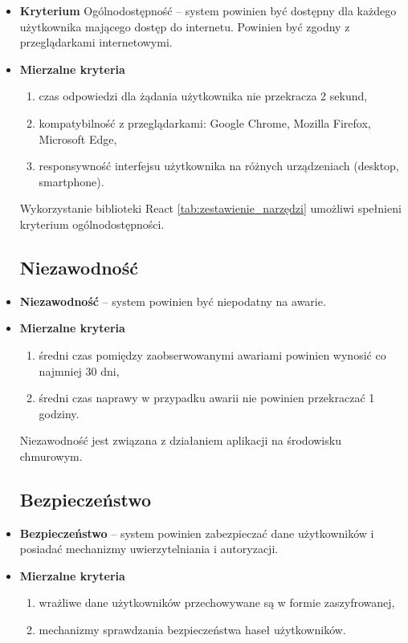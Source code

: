 \begin{itemize}
	\item \textbf{Kryterium} Ogólnodostępność -- system powinien być dostępny dla każdego użytkownika mającego dostęp do internetu. Powinien być zgodny z przeglądarkami internetowymi.
	\item \textbf{Mierzalne kryteria}
		\begin{enumerate}
			\item czas odpowiedzi dla żądania użytkownika nie przekracza 2 sekund,
			\item kompatybilność z przeglądarkami: Google Chrome, Mozilla Firefox, Microsoft Edge,
			\item responsywność interfejsu użytkownika na różnych urządzeniach (desktop, smartphone).
		\end{enumerate}
	Wykorzystanie biblioteki React \ref{tab:zestawienie_narzędzi} umożliwi spełnieni kryterium ogólnodostępności.
		
\subsection{Niezawodność}
	\item \textbf{Niezawodność} -- system powinien być niepodatny na awarie.
	\item \textbf{Mierzalne kryteria}
		\begin{enumerate}
			\item średni czas pomiędzy zaobserwowanymi awariami powinien wynosić co najmniej 30 dni,
			\item średni czas naprawy w przypadku awarii nie powinien przekraczać 1 godziny.
		\end{enumerate}
	Niezawodność jest związana z działaniem aplikacji na środowisku chmurowym. 
	
	\subsection{Bezpieczeństwo}
	
	\item \textbf{Bezpieczeństwo} -- system powinien zabezpieczać dane użytkowników i posiadać mechanizmy uwierzytelniania i autoryzacji.
	\item \textbf{Mierzalne kryteria}
		\begin{enumerate}
			\item wrażliwe dane użytkowników przechowywane są w formie zaszyfrowanej,
			\item mechanizmy sprawdzania bezpieczeństwa haseł użytkowników.
		\end{enumerate}
		

\end{itemize}
